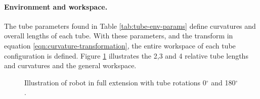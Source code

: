 \paragraph{Environment and workspace.} The tube parameters found in Table \ref{tab:tube-env-params} define curvatures and overall lengths of each tube. With these parameters, and the transform in equation \ref{eqn:curvature-transformation}, the entire workspace of each tube configuration is defined. Figure \ref{fig:workspace} illustrates the 2,3 and 4 relative tube lengths and curvatures and the general workspace.

\begin{figure}
    \caption{Illustration of robot in full extension with tube rotations 0$^{\circ}$ and 180$^{\circ}$.}
    \label{fig:workspace}
\end{figure}

